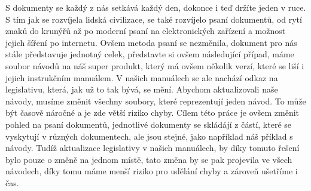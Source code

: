 S dokumenty se každý z nás setkává každý den, dokonce i teď držíte jeden v ruce. S tím jak se rozvíjela lidská civilizace,
se také rozvíjelo psaní dokumentů, od rytí znaků do krunýřů až po moderní psaní na elektronických zařízení a možnost jejich šíření po internetu.
Ovšem metoda psaní se nezměnila, dokument pro nás stále představuje jednotný celek, představte si ovšem následující případ, máme soubor návodů na náš super
produkt, který má ovšem několik verzí, které se liší i jejich instrukčním manuálem. V našich manuálech se ale nachází odkaz na legislativu, která, jak už to tak
bývá, se mění. Abychom aktualizovali naše návody, musíme změnit všechny soubory, které reprezentují jeden návod. To může být časově náročné a je zde větší riziko
chyby. Cílem této práce je ovšem změnit pohled na psaní dokumentů, jednotlivé dokumenty se skládájí z částí, které se vyskytují v různých dokumentech, ale jsou stejné,
jako například náš příklad s návody. Tudíž aktualizace legislativy v našich manuálech, by díky tomuto řešení bylo pouze o změně na jednom místě, tato změna by se pak
projevila ve všech návodech, díky tomu máme menší riziko pro udělání chyby a zároveň ušetříme i čas.